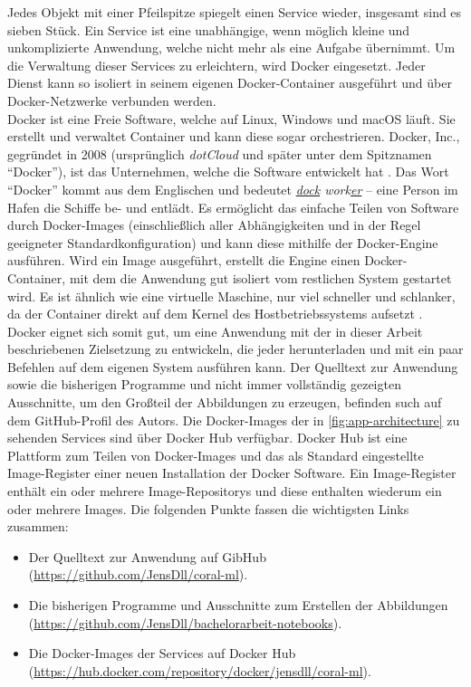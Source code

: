 \noindent
Jedes Objekt mit einer Pfeilspitze spiegelt einen Service wieder, insgesamt sind
es sieben Stück. Ein Service ist eine unabhängige, wenn möglich kleine und
unkomplizierte Anwendung, welche nicht mehr als eine Aufgabe übernimmt.
Um die Verwaltung dieser Services zu erleichtern, wird Docker eingesetzt.
Jeder Dienst kann so isoliert in seinem eigenen Docker-Container ausgeführt
und über Docker-Netzwerke verbunden werden.\\[8pt]
Docker ist eine Freie Software, welche auf Linux, Windows und macOS
läuft. Sie erstellt und verwaltet Container
und kann diese sogar orchestrieren.
Docker, Inc., gegründet in 2008 (ursprünglich \textit{dotCloud} und später unter
dem Spitznamen \enquote{Docker}), ist das Unternehmen,
welche die Software entwickelt hat \parencite{onlide:docker-inc}.
Das Wort \enquote{Docker} kommt aus dem Englischen
und bedeutet \textit{\underline{dock} work\underline{er}} --
eine Person im Hafen die Schiffe be- und entlädt.
Es ermöglicht das einfache Teilen von Software
durch Docker-Images (einschließlich aller Abhängigkeiten
und in der Regel geeigneter Standardkonfiguration) und kann
diese mithilfe der Docker-Engine ausführen.
Wird ein Image ausgeführt, erstellt die Engine einen Docker-Container,
mit dem die Anwendung gut isoliert vom restlichen System gestartet wird.
Es ist ähnlich wie eine virtuelle Maschine,
nur viel schneller und schlanker, 
da der Container direkt auf dem Kernel des Hostbetriebssystems aufsetzt
\parencite[11-14]{book:docker-dd} \parencite[672]{book:hands-on-ml}.\\[8pt]
Docker eignet sich somit gut, um eine Anwendung mit der in dieser Arbeit beschriebenen
Zielsetzung zu entwickeln, die jeder herunterladen und mit ein paar Befehlen
auf dem eigenen System ausführen kann. Der Quelltext zur Anwendung
sowie die bisherigen Programme und nicht immer vollständig gezeigten
Ausschnitte, um den Großteil der Abbildungen zu erzeugen,
befinden such auf dem GitHub-Profil des Autors.
Die Docker-Images der in \autoref{fig:app-architecture} zu sehenden
Services sind über Docker Hub verfügbar.
Docker Hub ist eine Plattform zum Teilen von Docker-Images und das als Standard
eingestellte Image-Register einer neuen Installation der Docker Software.
Ein Image-Register enthält ein oder mehrere Image-Repositorys
und diese enthalten wiederum ein oder mehrere Images.
Die folgenden Punkte fassen die wichtigsten Links zusammen:
\begin{itemize}
  \item Der Quelltext zur Anwendung auf GibHub
        (\url{https://github.com/JensDll/coral-ml}).
  \item Die bisherigen Programme und Ausschnitte zum Erstellen der Abbildungen
        (\url{https://github.com/JensDll/bachelorarbeit-notebooks}).
  \item Die Docker-Images der Services auf Docker Hub
        (\href{https://hub.docker.com/repository/docker/jensdll/coral-ml}
        {https://hub.docker.com/reposito\allowbreak ry/docker/jensdll/coral-ml}).
\end{itemize}

